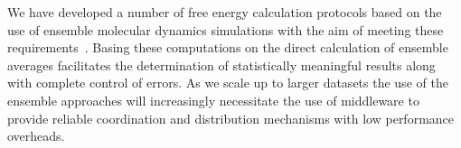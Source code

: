 We have developed a number of free energy calculation protocols based on the
use of ensemble molecular dynamics simulations with the aim of meeting these
requirements~\cite{Sadiq2008, Sadiq2010, Wan2017brd4, Wan2017trk}.
Basing these computations on the direct calculation of ensemble averages facilitates
the determination of statistically meaningful results along with complete
control of errors. 
As we scale up to larger datasets the use of the ensemble approaches will increasingly 
necessitate the use of middleware to  provide reliable coordination and distribution 
mechanisms with low performance overheads.
